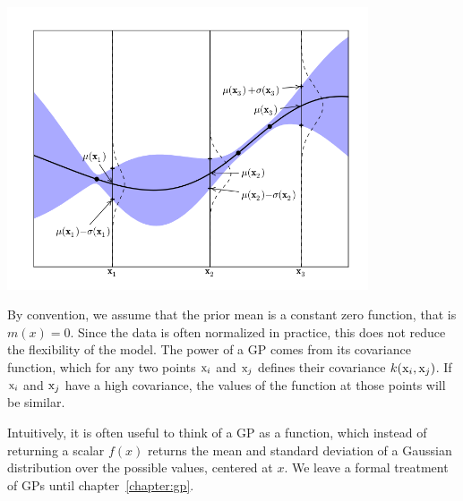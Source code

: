 \begin{center}
  \includegraphics[width=0.8\textwidth]{images/gp-1d.png}
\end{center}

By convention, we assume that the prior mean is a constant zero function, that
is $m(x) = 0$. Since the data is often normalized in practice, this does not
reduce the flexibility of the model. The power of a GP comes from its
covariance function, which for any two points ${\textnormal{x}}_i$ and ${\textnormal{x}}_j$ defines their
covariance $k({\textnormal{x}}_i, {\textnormal{x}}_j)$. If ${\textnormal{x}}_i$ and ${\textnormal{x}}_j$ have a high covariance,
the values of the function at those points will be similar.

Intuitively, it is often useful to think of a GP as a function, which instead
of returning a scalar $f(x)$ returns the mean and standard deviation of a
Gaussian distribution over the possible values, centered at $x$. We leave a formal
treatment of GPs until chapter~\ref{chapter:gp}.


%
%
%
%
%

